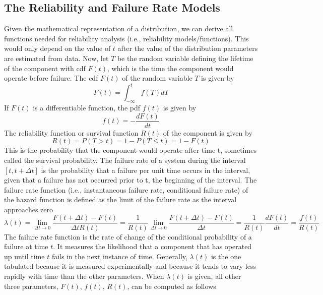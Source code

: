\subsection{The Reliability and Failure Rate Models}
Given the mathematical representation of a distribution, we can derive all functions needed
for reliability analysis (i.e., reliability models/functions). This would only depend on the value of $t$
after the value of the distribution parameters are estimated from data.
Now, let $T$ be the random variable defining the lifetime of the component with cdf $F(t)$, which is the
time the component would operate before failure. The cdf $F(t)$ of the random variable $T$ is given by
\begin{equation}
  F(t) = \int_{-\infty}^{t} f(T)dT
\end{equation}
If $F(t)$ is a differentiable function, the pdf $f(t)$ is given by
\begin{equation}
  f(t) = - \frac{dF(t)}{dt}
\end{equation}
The reliability function or survival function $R(t)$ of the component is given by
\begin{equation}
  R(t) = P(T>t) = 1 - P(T\leq t) = 1-F(t)
\end{equation}
This is the probability that the component would operate after time t, sometimes called the survival probability.
The failure rate of a system during the interval $[t,t+\Delta t]$ is the probability that a failure per
unit time occurs in the interval, given that a failure has not occurred prior to t, the beginning of the
interval. The failure rate function (i.e., instantaneous failure rate, conditional failure rate) of the hazard
function is defined as the limit of the failure rate as the interval approaches zero
\begin{equation}
  \lambda (t)= \lim_{\Delta t\rightarrow 0} \frac{F(t+\Delta t) - F(t)}{\Delta tR(t)}
	 = \frac{1}{R(t)} \lim_{\Delta t\rightarrow 0} \frac{F(t+\Delta t) - F(t)}{\Delta t}
	 = \frac{1}{R(t)}\frac{dF(t)}{dt} = \frac{f(t)}{R(t)}
\end{equation}
The failure rate function is the rate of change of the conditional probability of a failure at time $t$.
It measures the likelihood that a component that has operated up until time $t$ fails in the next
instance of time.
Generally, $\lambda (t)$ is the one tabulated because it is measured experimentally and because it tends to
vary less rapidly with time than the other parameters. When $\lambda (t)$ is given, all other three
parameters, $F(t)$, $f(t)$, $R(t)$, can be computed as follows

